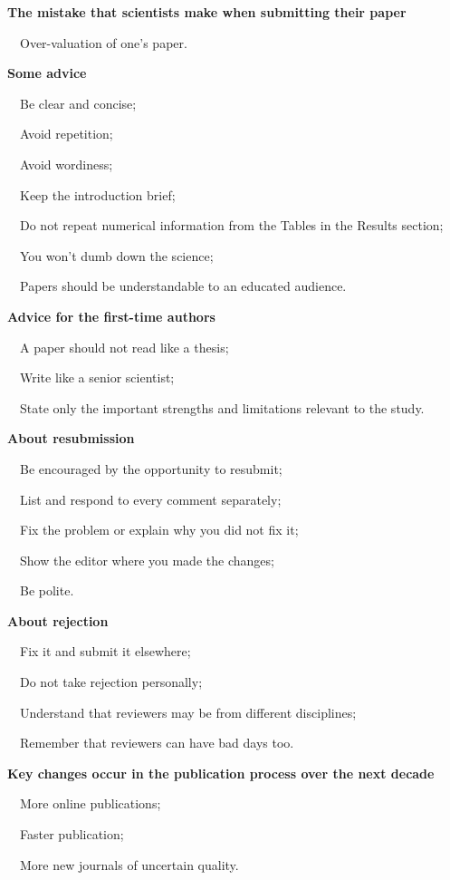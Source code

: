 \documentclass[a4paper, 12pt]{article}
\begin{document}
\textbf{The mistake that scientists make when submitting their paper}
\par\ \textbullet\ Over-valuation of one's paper.

\textbf{Some advice}
\par\ \textbullet\ Be clear and concise;
\par\ \textbullet\ Avoid repetition;
\par\ \textbullet\ Avoid wordiness;
\par\ \textbullet\ Keep the introduction brief;
\par\ \textbullet\ Do not repeat numerical information from the Tables in the Results section;
\par\ \textbullet\ You won't dumb down the science;
\par\ \textbullet\ Papers should be understandable to an educated audience.

\textbf{Advice for the first-time authors}
\par\ \textbullet\ A paper should not read like a thesis;
\par\ \textbullet\ Write like a senior scientist;
\par\ \textbullet\ State only the important strengths and limitations relevant to the study.

\newpage\textbf{About resubmission}
\par\ \textbullet\ Be encouraged by the opportunity to resubmit;
\par\ \textbullet\ List and respond to every comment separately;
\par\ \textbullet\ Fix the problem or explain why you did not fix it;
\par\ \textbullet\ Show the editor where you made the changes;
\par\ \textbullet\ Be polite.

\textbf{About rejection}
\par\ \textbullet\ Fix it and submit it elsewhere;
\par\ \textbullet\ Do not take rejection personally;
\par\ \textbullet\ Understand that reviewers may be from different disciplines;
\par\ \textbullet\ Remember that reviewers can have bad days too.

\textbf{Key changes occur in the publication process over the next decade}
\par\ \textbullet\ More online publications;
\par\ \textbullet\ Faster publication;
\par\ \textbullet\ More new journals of uncertain quality.
\end{document}
